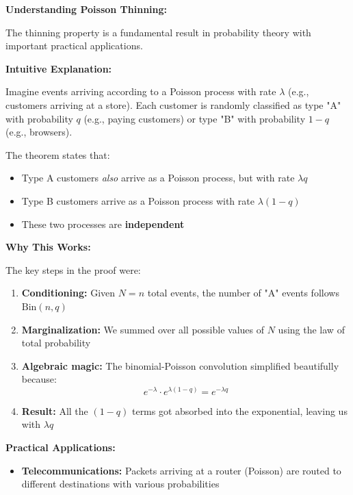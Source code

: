 \documentclass[12pt]{article}
\begin{document}
\begin{explanation}
\textbf{Understanding Poisson Thinning:}

The thinning property is a fundamental result in probability theory with important practical applications.

\textbf{Intuitive Explanation:}

Imagine events arriving according to a Poisson process with rate \(\lambda\) (e.g., customers arriving at a store). Each customer is randomly classified as type "A" with probability \(q\) (e.g., paying customers) or type "B" with probability \(1-q\) (e.g., browsers).

The theorem states that:
\begin{itemize}
    \item Type A customers \textit{also} arrive as a Poisson process, but with rate \(\lambda q\)
    \item Type B customers arrive as a Poisson process with rate \(\lambda(1-q)\)
    \item These two processes are \textbf{independent}
\end{itemize}

\textbf{Why This Works:}

The key steps in the proof were:
\begin{enumerate}
    \item \textbf{Conditioning:} Given \(N = n\) total events, the number of "A" events follows \(\text{Bin}(n, q)\)

    \item \textbf{Marginalization:} We summed over all possible values of \(N\) using the law of total probability

    \item \textbf{Algebraic magic:} The binomial-Poisson convolution simplified beautifully because:
    \[
    e^{-\lambda} \cdot e^{\lambda(1-q)} = e^{-\lambda q}
    \]

    \item \textbf{Result:} All the \((1-q)\) terms got absorbed into the exponential, leaving us with \(\lambda q\)
\end{enumerate}

\textbf{Practical Applications:}

\begin{itemize}
    \item \textbf{Telecommunications:} Packets arriving at a router (Poisson) are routed to different destinations with various probabilities


\end{itemize}
\end{explanation}
\end{document}
